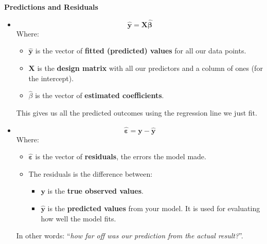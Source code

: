 \highspace
\begin{flushleft}
    \textcolor{Green3}{ \textbf{Predictions and Residuals}}
\end{flushleft}
\begin{itemize}
    \item {}
    \begin{equation}
        \hat{\mathbf{y}} = \mathbf{X} \hat{\boldsymbol{\beta}}
    \end{equation}
    Where:
    \begin{itemize}
        \item $\hat{\mathbf{y}}$ is the vector of \textbf{fitted (predicted) values} for all our data points.
        \item $\mathbf{X}$ is the \textbf{design matrix} with all our predictors and a column of ones (for the intercept).
        \item $\hat{\beta}$ is the vector of \textbf{estimated coefficients}.
    \end{itemize}
    This gives us all the predicted outcomes using the regression line we just fit.

    \item {}
    \begin{equation}
        \hat{\boldsymbol{\varepsilon}} = \mathbf{y} - \hat{\mathbf{y}}
    \end{equation}
    Where:
    \begin{itemize}
        \item $\hat{\boldsymbol{\varepsilon}}$ is the vector of \textbf{residuals}, the errors the model made.
        \item The residuals is the difference between:
        \begin{itemize}
            \item $\mathbf{y}$ is the \textbf{true observed values}.
            \item $\hat{\mathbf{y}}$ is the \textbf{predicted values} from your model. It is used for evaluating how well the model fits.
        \end{itemize}
    \end{itemize}
    In other words: ``\emph{how far off was our prediction from the actual result?}''.
\end{itemize}

